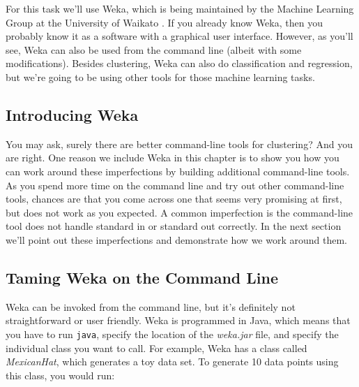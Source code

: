 \documentclass[
]{book}
\theoremstyle{definition}
\theoremstyle{definition}
\theoremstyle{definition}
\theoremstyle{remark}
\begin{document}
For this task we'll use Weka, which is being maintained by the Machine Learning Group at the University of Waikato \citep{Hall2009}. If you already know Weka, then you probably know it as a software with a graphical user interface. However, as you'll see, Weka can also be used from the command line (albeit with some modifications). Besides clustering, Weka can also do classification and regression, but we're going to be using other tools for those machine learning tasks.

\hypertarget{introducing-weka}{%
\subsection{Introducing Weka}\label{introducing-weka}}

You may ask, surely there are better command-line tools for clustering? And you are right. One reason we include Weka in this chapter is to show you how you can work around these imperfections by building additional command-line tools. As you spend more time on the command line and try out other command-line tools, chances are that you come across one that seems very promising at first, but does not work as you expected. A common imperfection is the command-line tool does not handle standard in or standard out correctly. In the next section we'll point out these imperfections and demonstrate how we work around them.

\hypertarget{taming-weka-on-the-command-line}{%
\subsection{Taming Weka on the Command Line}\label{taming-weka-on-the-command-line}}

Weka can be invoked from the command line, but it's definitely not straightforward or user friendly. Weka is programmed in Java, which means that you have to run \texttt{java}, specify the location of the \emph{weka.jar} file, and specify the individual class you want to call. For example, Weka has a class called \emph{MexicanHat}, which generates a toy data set. To generate 10 data points using this class, you would run:
\end{document}
